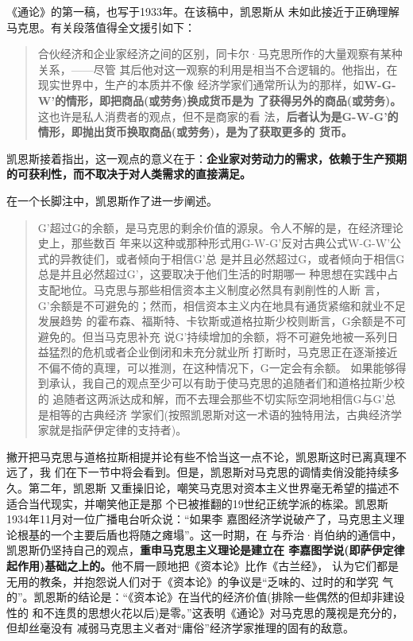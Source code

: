 《通论》的第一稿，也写于1933年。在该稿中，凯恩斯从
未如此接近于正确理解马克思。有关段落值得全文援引如下：
\begin{quotation}
  合伙经济和企业家经济之间的区别，同卡尔·马克思所作的大量观察有某种关系，——尽管
  其后他对这一观察的利用是相当不合逻辑的。他指出，在现实世界中，生产的本质并不像
  经济学家们通常所认为的那样，如\textbf{W-G-W'的情形，即把商品(或劳务)换成货币是为
    了获得另外的商品(或劳务)。}这也许是私人消费者的观点，但不是商家的看
  法，\textbf{后者认为是G-W-G'的情形，即抛出货币换取商品(或劳务)，是为了获取更多的
    货币。}
\end{quotation}
凯恩斯接着指出，这一观点的意义在于：\textbf{企业家对劳动力的需求，依赖于生产预期
  的可获利性，而不取决于对人类需求的直接满足。}

在一个长脚注中，凯恩斯作了进一步阐述。
\begin{quotation}
  G'超过G的余额，是马克思的剩余价值的源泉。令人不解的是，在经济理论史上，那些数百
  年来以这种或那种形式用G-W-G'反对古典公式W-G-W'公式的异教徒们，或者倾向于相信G'总
  是并且必然超过G，或者倾向于相信G总是并且必然超过G'，这要取决于他们生活的时期哪一
  种思想在实践中占支配地位。马克思与那些相信资本主义制度必然具有剥削性的人断
  言，G'余额是不可避免的；然而，相信资本主义内在地具有通货紧缩和就业不足发展趋势
  的霍布森、福斯特、卡钦斯或道格拉斯少校则断言，G余额是不可避免的。但当马克思补充
  说G'持续增加的余额，将不可避免地被一系列日益猛烈的危机或者企业倒闭和未充分就业所
  打断时，马克思正在逐渐接近不偏不倚的真理，可以推测，在这种情况下，G一定会有余额。
  如果能够得到承认，我自己的观点至少可以有助于使马克思的追随者们和道格拉斯少校的
  追随者这两派达成和解，而不去理会那些不切实际空洞地相信G与G'总是相等的古典经济
  学家们(按照凯恩斯对这一术语的独特用法，古典经济学家就是指萨伊定律的支持者)。
\end{quotation}

撇开把马克思与道格拉斯相提并论有些不恰当这一点不论，凯恩斯这时已离真理不远了，我
们在下一节中将会看到。但是，凯恩斯对马克思的调情卖俏没能持续多久。第二年，凯恩斯
又重操旧论，嘲笑马克思对资本主义世界毫无希望的描述不适合当代现实，并嘲笑他正是那
个已被推翻的19世纪正统学派的栋梁。凯恩斯1934年11月对一位广播电台听众说：“如果李
嘉图经济学说破产了，马克思主义理论根基的一个主要后盾也将随之瘫塌”。这一时期，在
与乔治·肖伯纳的通信中，凯恩斯仍坚持自己的观点，\textbf{重申马克思主义理论是建立在
  李嘉图学说(即萨伊定律起作用)基础之上的。}他不屑一顾地把《资本论》比作《古兰经》，
认为它们都是无用的教条，并抱怨说人们对于《资本论》的争议是“乏味的、过时的和学究
气的”。凯恩斯的结论是：“《资本论》在当代的经济价值(排除一些偶然的但却非建设性的
和不连贯的思想火花以后)是零。”这表明《通论》对马克思的蔑视是充分的，但却丝毫没有
减弱马克思主义者对“庸俗”经济学家推理的固有的敌意。

